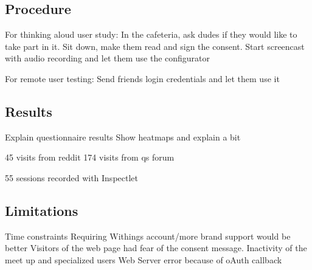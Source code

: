 \documentclass[../medieninformatik-arbeit.tex]{subfiles}
\begin{document}
\subsection{Procedure}

For thinking aloud user study:
In the cafeteria, ask dudes if they would like to take part in it.
Sit down, make them read and sign the consent. Start screencast with audio recording and let them use the configurator

For remote user testing:
Send friends login credentials and let them use it


\subsection{Results}
Explain questionnaire results
Show heatmaps and explain a bit

45 visits from reddit
174 visits from qs forum

55 sessions recorded with Inspectlet

\subsection{Limitations}
Time constraints
Requiring Withings account/more brand support would be better 
Visitors of the web page had fear of the consent message. 
Inactivity of the meet up and specialized users
Web Server error because of oAuth callback
\end{document}
